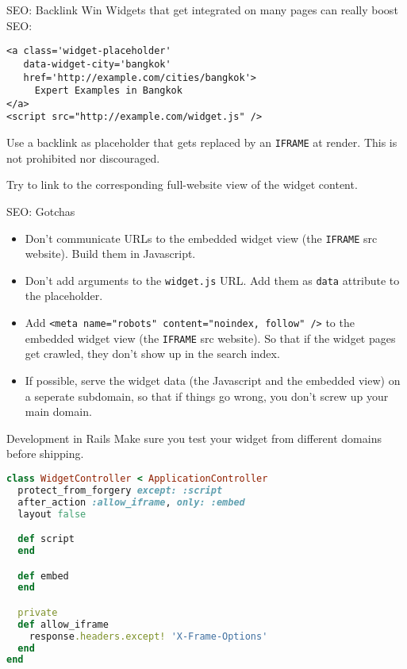 \documentclass{beamer}
\begin{document}
\begin{frame}[fragile]{SEO: Backlink Win}
Widgets that get integrated on many pages can really boost SEO:
\begin{lstlisting}
<a class='widget-placeholder'
   data-widget-city='bangkok'
   href='http://example.com/cities/bangkok'>
     Expert Examples in Bangkok
</a>
<script src="http://example.com/widget.js" />
\end{lstlisting}
Use a backlink as placeholder that gets replaced by an \lstinline{IFRAME} at render. This is not prohibited nor discouraged.

Try to link to the corresponding full-website view of the widget content.
\end{frame}

\begin{frame}[fragile]{SEO: Gotchas}
\begin{itemize}
  \item Don't communicate URLs to the embedded widget view (the \lstinline{IFRAME} src website). Build them in Javascript.
  \item Don't add arguments to the \lstinline{widget.js} URL. Add them as \lstinline{data} attribute to the placeholder.
  \item Add \lstinline{<meta name="robots" content="noindex, follow" />} to the embedded widget view (the \lstinline{IFRAME} src website). So that if the widget pages get crawled, they don't show up in the search index.
  \item If possible, serve the widget data (the Javascript and the embedded view) on a seperate subdomain, so that if things go wrong, you don't screw up your main domain.
\end{itemize}
\end{frame}

\begin{frame}[fragile]{Development in Rails}
Make sure you test your widget from different domains before shipping.
\begin{lstlisting}[language=Ruby]
class WidgetController < ApplicationController
  protect_from_forgery except: :script
  after_action :allow_iframe, only: :embed
  layout false

  def script
  end

  def embed
  end

  private
  def allow_iframe
    response.headers.except! 'X-Frame-Options'
  end
end
\end{lstlisting}
\end{frame}
\end{document}
